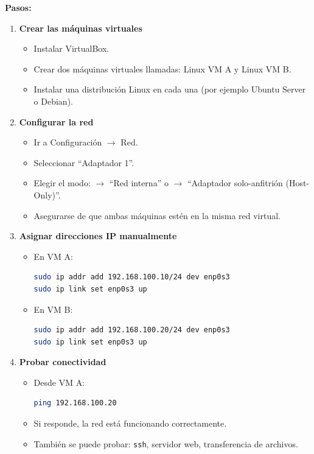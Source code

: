 \documentclass[12pt,a4paper]{report}
\begin{document}
\textbf{Pasos:}
\begin{enumerate}
    \item \textbf{Crear las máquinas virtuales}
    \begin{itemize}
        \item Instalar VirtualBox.
        \item Crear dos máquinas virtuales llamadas: Linux VM A y Linux VM B.
        \item Instalar una distribución Linux en cada una (por ejemplo Ubuntu Server o Debian).
    \end{itemize}
    \item \textbf{Configurar la red}
    \begin{itemize}
        \item Ir a Configuración $\rightarrow$ Red.
        \item Seleccionar ``Adaptador 1''.
        \item Elegir el modo: $\rightarrow$ ``Red interna'' o $\rightarrow$ ``Adaptador solo-anfitrión (Host-Only)''.
        \item Asegurarse de que ambas máquinas estén en la misma red virtual.
    \end{itemize}
    \item \textbf{Asignar direcciones IP manualmente}
    \begin{itemize}
        \item En VM A: 
        \begin{lstlisting}[language=bash]
sudo ip addr add 192.168.100.10/24 dev enp0s3
sudo ip link set enp0s3 up
        \end{lstlisting}
        \item En VM B: 
        \begin{lstlisting}[language=bash]
sudo ip addr add 192.168.100.20/24 dev enp0s3
sudo ip link set enp0s3 up
        \end{lstlisting}
    \end{itemize}
    \item \textbf{Probar conectividad}
    \begin{itemize}
        \item Desde VM A: 
        \begin{lstlisting}[language=bash]
ping 192.168.100.20
        \end{lstlisting}
        \item Si responde, la red está funcionando correctamente.
        \item También se puede probar: \texttt{ssh}, servidor web, transferencia de archivos.
    \end{itemize}
\end{enumerate}
\end{document}
